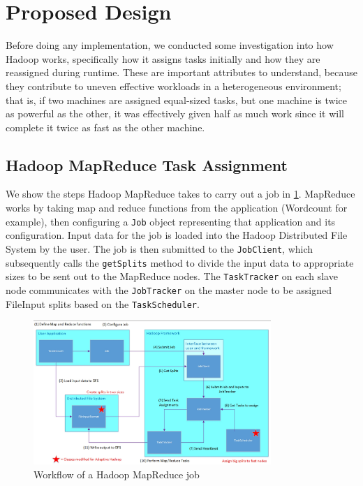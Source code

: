 \section{Proposed Design}
\label{section:propeseddesign}

Before doing any implementation, we conducted some investigation into how Hadoop works, 
specifically how it assigns tasks initially and how they are reassigned during runtime.
These are important attributes to understand, because they contribute to uneven effective
workloads in a heterogeneous environment; that is, if two machines are assigned equal-sized
tasks, but one machine is twice as powerful as the other, it was effectively given half as
much work since it will complete it twice as fast as the other machine.

\subsection{Hadoop MapReduce Task Assignment}

We show the steps Hadoop MapReduce takes to carry out a job in \ref{fig:flow}. MapReduce 
works by taking map and reduce functions from the application (Wordcount for example), 
then configuring a \texttt{Job} object representing that application and its configuration.
Input data for the job is loaded into the Hadoop Distributed File System by the user. 
The job is then submitted to the \texttt{JobClient}, which subsequently calls the 
\texttt{getSplits} method to divide the input data to appropriate sizes to be sent out to
the MapReduce nodes. The \texttt{TaskTracker} on each slave node communicates with
the \texttt{JobTracker} on the master node to be assigned FileInput splits based on the
\texttt{TaskScheduler}.

\begin{figure}[ht!]
\centering
\includegraphics[width=90mm]{flow.jpg}
\caption{Workflow of a Hadoop MapReduce job}
\label{fig:flow}
\end{figure}

